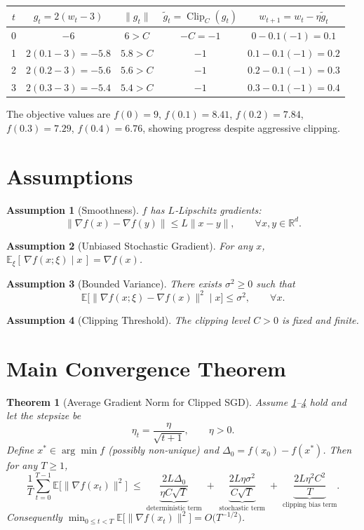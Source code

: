 \documentclass{article}
\newtheorem{theorem}{Theorem}
\newtheorem{assumption}{Assumption}
\newcommand{\E}{\mathbb{E}}
\newcommand{\R}{\mathbb{R}}
\begin{document}
\begin{center}
\begin{tabular}{c|c|c|c|c}
$t$ & $g_{t}=2(w_{t}-3)$ & $\|g_{t}\|$ & $\tilde g_{t}=\operatorname{Clip}_{C}(g_{t})$ & $w_{t+1}=w_{t}-\eta\tilde g_{t}$ \\ \hline
0 & $-6$ & $6> C$ & $-C=-1$ & $0-0.1(-1)=0.1$ \\[4pt]
1 & $2(0.1-3)=-5.8$ & $5.8>C$ & $-1$ & $0.1-0.1(-1)=0.2$ \\[4pt]
2 & $2(0.2-3)=-5.6$ & $5.6>C$ & $-1$ & $0.2-0.1(-1)=0.3$ \\[4pt]
3 & $2(0.3-3)=-5.4$ & $5.4>C$ & $-1$ & $0.3-0.1(-1)=0.4$
\end{tabular}
\end{center}
The objective values are $f(0)=9$, $f(0.1)=8.41$, $f(0.2)=7.84$, $f(0.3)=7.29$, $f(0.4)=6.76$, showing progress despite aggressive clipping.

\newpage
\section*{Assumptions}
\begin{assumption}[Smoothness]\label{as:smooth}
$f$ has $L$‑Lipschitz gradients:
\[
\|\nabla f(x)-\nabla f(y)\|\le L\|x-y\|,\qquad\forall x,y\in\R^{d}.
\tag{A1}
\]
\end{assumption}
\begin{assumption}[Unbiased Stochastic Gradient]\label{as:unbiased}
For any $x$, $\E_{\xi}[\,\nabla f(x;\xi)\mid x\,]=\nabla f(x)$.
\end{assumption}
\begin{assumption}[Bounded Variance]\label{as:variance}
There exists $\sigma^{2}\ge0$ such that
\[
\E\big[\|\nabla f(x;\xi)-\nabla f(x)\|^{2}\mid x\big]\le\sigma^{2},
\qquad\forall x.
\tag{A3}
\]
\end{assumption}
\begin{assumption}[Clipping Threshold]\label{as:clip}
The clipping level $C>0$ is fixed and finite.
\end{assumption}

\section*{Main Convergence Theorem}
\begin{theorem}[Average Gradient Norm for Clipped SGD]\label{thm:main}
Assume \ref{as:smooth}–\ref{as:clip} hold and let the stepsize be
\[
\eta_{t}= \frac{\eta}{\sqrt{t+1}},\qquad \eta>0.
\]
Define $x^{*}\in\arg\min f$ (possibly non‑unique) and $ \Delta_{0}=f(x_{0})-f(x^{*})$.
Then for any $T\ge 1$,
\[
\frac{1}{T}\sum_{t=0}^{T-1}\E\!\big[\|\nabla f(x_{t})\|^{2}\big]
\;\le\;
\underbrace{\frac{2L\Delta_{0}}{\eta C\sqrt{T}}}_{\text{deterministic term}}
\;+\;
\underbrace{\frac{2L\eta\sigma^{2}}{C\sqrt{T}}}_{\text{stochastic term}}
\;+\;
\underbrace{\frac{2L\eta^{2}C^{2}}{T}}_{\text{clipping bias term}} .
\tag{3}
\]
Consequently $\displaystyle \min_{0\le t<T}\E\!\big[\|\nabla f(x_{t})\|^{2}\big]=O\!\big(T^{-1/2}\big)$.
\end{theorem}
\end{document}
